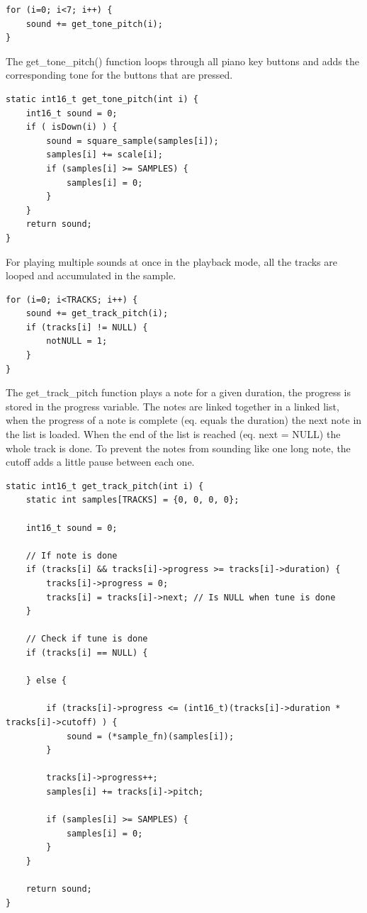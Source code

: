 \begin{lstlisting}
for (i=0; i<7; i++) {
	sound += get_tone_pitch(i);
}
\end{lstlisting}
The get_tone_pitch() function loops through all piano key buttons and adds the corresponding tone for the buttons that are pressed.\\
\begin{lstlisting}
static int16_t get_tone_pitch(int i) {
	int16_t sound = 0;
	if ( isDown(i) ) {
		sound = square_sample(samples[i]);
		samples[i] += scale[i];
		if (samples[i] >= SAMPLES) {
			samples[i] = 0;
		}
	}
	return sound;
}
\end{lstlisting}
For playing multiple sounds at once in the playback mode, all the tracks are looped and accumulated in the sample.\\
\begin{lstlisting}
for (i=0; i<TRACKS; i++) {
	sound += get_track_pitch(i);
	if (tracks[i] != NULL) {
		notNULL = 1;
	}
}
\end{lstlisting}
The get_track_pitch function plays a note for a given duration, the progress is stored in the progress variable. The notes are linked together in a linked list, when the progress of a note is complete (eq. equals the duration) the next note in the list is loaded. When the end of the list is reached (eq. next = NULL) the whole track is done. To prevent the notes from sounding like one long note, the cutoff adds a little pause between each one.
\begin{lstlisting}
static int16_t get_track_pitch(int i) {
	static int samples[TRACKS] = {0, 0, 0, 0};

	int16_t sound = 0;

	// If note is done
	if (tracks[i] && tracks[i]->progress >= tracks[i]->duration) {
		tracks[i]->progress = 0;
		tracks[i] = tracks[i]->next; // Is NULL when tune is done
	}

	// Check if tune is done
	if (tracks[i] == NULL) {

	} else {

		if (tracks[i]->progress <= (int16_t)(tracks[i]->duration * tracks[i]->cutoff) ) {
			sound = (*sample_fn)(samples[i]);
		}

		tracks[i]->progress++;
		samples[i] += tracks[i]->pitch;

		if (samples[i] >= SAMPLES) {
			samples[i] = 0;
		}
	}

	return sound;
}
\end{lstlisting}
